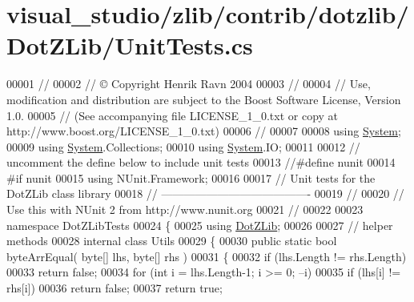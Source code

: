 \hypertarget{visual__studio_2zlib_2contrib_2dotzlib_2_dot_z_lib_2_unit_tests_8cs_source}{}\section{visual\+\_\+studio/zlib/contrib/dotzlib/\+Dot\+Z\+Lib/\+Unit\+Tests.cs}
\label{visual__studio_2zlib_2contrib_2dotzlib_2_dot_z_lib_2_unit_tests_8cs_source}

\begin{DoxyCode}
00001 \textcolor{comment}{//}
00002 \textcolor{comment}{// © Copyright Henrik Ravn 2004}
00003 \textcolor{comment}{//}
00004 \textcolor{comment}{// Use, modification and distribution are subject to the Boost Software License, Version 1.0.}
00005 \textcolor{comment}{// (See accompanying file LICENSE\_1\_0.txt or copy at http://www.boost.org/LICENSE\_1\_0.txt)}
00006 \textcolor{comment}{//}
00007 
00008 \textcolor{keyword}{using} \hyperlink{namespace_system}{System};
00009 \textcolor{keyword}{using} \hyperlink{namespace_system}{System}.Collections;
00010 \textcolor{keyword}{using} \hyperlink{namespace_system}{System}.IO;
00011 
00012 \textcolor{comment}{// uncomment the define below to include unit tests}
00013 \textcolor{comment}{//#define nunit}
00014 \textcolor{preprocessor}{#if nunit}
00015 \textcolor{keyword}{using} NUnit.Framework;
00016 
00017 \textcolor{comment}{// Unit tests for the DotZLib class library}
00018 \textcolor{comment}{// ----------------------------------------}
00019 \textcolor{comment}{//}
00020 \textcolor{comment}{// Use this with NUnit 2 from http://www.nunit.org}
00021 \textcolor{comment}{//}
00022 
00023 \textcolor{keyword}{namespace }DotZLibTests
00024 \{
00025     \textcolor{keyword}{using} \hyperlink{namespace_dot_z_lib}{DotZLib};
00026 
00027     \textcolor{comment}{// helper methods}
00028     \textcolor{keyword}{internal} \textcolor{keyword}{class }Utils
00029     \{
00030         \textcolor{keyword}{public} \textcolor{keyword}{static} \textcolor{keywordtype}{bool} byteArrEqual( byte[] lhs, byte[] rhs )
00031         \{
00032             \textcolor{keywordflow}{if} (lhs.Length != rhs.Length)
00033                 \textcolor{keywordflow}{return} \textcolor{keyword}{false};
00034             \textcolor{keywordflow}{for} (\textcolor{keywordtype}{int} i = lhs.Length-1; i >= 0; --i)
00035                 \textcolor{keywordflow}{if} (lhs[i] != rhs[i])
00036                     \textcolor{keywordflow}{return} \textcolor{keyword}{false};
00037             \textcolor{keywordflow}{return} \textcolor{keyword}{true};

\end{DoxyCode}

